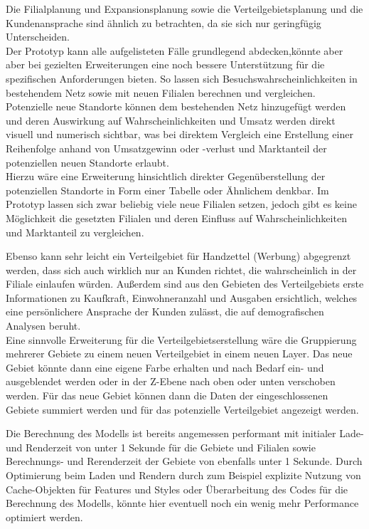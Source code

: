 Die Filialplanung und Expansionsplanung sowie die Verteilgebietsplanung und die Kundenansprache sind ähnlich zu betrachten, da sie sich nur geringfügig Unterscheiden.\\
Der Prototyp kann alle aufgelisteten Fälle grundlegend abdecken,könnte aber aber bei gezielten Erweiterungen eine noch bessere Unterstützung für die spezifischen Anforderungen bieten.
So lassen sich Besuchswahrscheinlichkeiten in bestehendem Netz sowie mit neuen Filialen berechnen und vergleichen.
Potenzielle neue Standorte können dem bestehenden Netz hinzugefügt werden und deren Auswirkung auf Wahrscheinlichkeiten und Umsatz werden direkt visuell und numerisch sichtbar, was bei direktem Vergleich eine Erstellung einer Reihenfolge anhand von Umsatzgewinn oder -verlust und Marktanteil der potenziellen neuen Standorte erlaubt.\\
Hierzu wäre eine Erweiterung hinsichtlich direkter Gegenüberstellung der potenziellen Standorte in Form einer Tabelle oder Ähnlichem denkbar. 
Im Prototyp lassen sich zwar beliebig viele neue Filialen setzen, jedoch gibt es keine Möglichkeit die gesetzten Filialen und deren Einfluss auf Wahrscheinlichkeiten und Marktanteil zu vergleichen.

Ebenso kann sehr leicht ein Verteilgebiet für Handzettel (Werbung) abgegrenzt werden, dass sich auch wirklich nur an Kunden richtet, die wahrscheinlich in der Filiale einlaufen würden.
Außerdem sind aus den Gebieten des Verteilgebiets erste Informationen zu Kaufkraft, Einwohneranzahl und Ausgaben ersichtlich, welches eine persönlichere Ansprache der Kunden zulässt, die auf demografischen Analysen beruht.\\
Eine sinnvolle Erweiterung für die Verteilgebietserstellung wäre die Gruppierung mehrerer Gebiete zu einem neuen Verteilgebiet in einem neuen Layer.
Das neue Gebiet könnte dann eine eigene Farbe erhalten und nach Bedarf ein- und ausgeblendet werden oder in der Z-Ebene nach oben oder unten verschoben werden.
Für das neue Gebiet können dann die Daten der eingeschlossenen Gebiete summiert werden und für das potenzielle Verteilgebiet angezeigt werden.

Die Berechnung des Modells ist bereits angemessen performant mit initialer Lade- und Renderzeit von unter 1 Sekunde für die Gebiete und Filialen sowie Berechnungs- und Rerenderzeit der Gebiete von ebenfalls unter 1 Sekunde.
Durch Optimierung beim Laden und Rendern durch zum Beispiel explizite Nutzung von Cache-Objekten für Features und Styles oder Überarbeitung des Codes für die Berechnung des Modells, könnte hier eventuell noch ein wenig mehr Performance optimiert werden.

